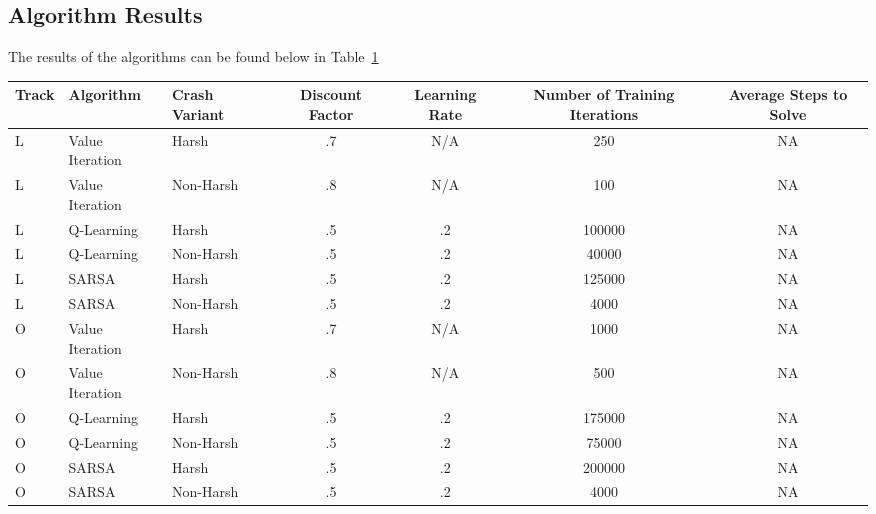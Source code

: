\documentclass{amsart}
\begin{document}
    \subsection{Algorithm Results}
    The results of the algorithms can be found below in Table~\ref{results_tab}
    \begin{table}
    \begin{adjustbox}{width=1\textwidth}
        \small
    \begin{tabular}{lllcccc}
        Track & Algorithm & Crash Variant & Discount Factor & Learning Rate & Number of Training Iterations & Average Steps to Solve \\
        \hline
        L & Value Iteration & Harsh       & .7              & N/A           & 250 & NA \\
        L & Value Iteration & Non-Harsh   & .8              & N/A           & 100 & NA \\
        L & Q-Learning      & Harsh       & .5              & .2           & 100000 & NA \\
        L & Q-Learning      & Non-Harsh   & .5              & .2           & 40000 & NA \\
        L & SARSA           & Harsh       & .5              & .2           & 125000 & NA \\
        L & SARSA           & Non-Harsh   & .5              & .2           & 4000 & NA \\
        O & Value Iteration & Harsh       & .7              & N/A           & 1000 & NA \\
        O & Value Iteration & Non-Harsh   & .8              & N/A           & 500 & NA \\
        O & Q-Learning      & Harsh       & .5              & .2           & 175000 & NA \\
        O & Q-Learning      & Non-Harsh   & .5              & .2           & 75000 & NA \\
        O & SARSA           & Harsh       & .5              & .2           & 200000 & NA \\
        O & SARSA           & Non-Harsh   & .5              & .2           & 4000 & NA \\


    \end{tabular}
    \end{adjustbox}
    \label{results_tab}
    \end{table}
\end{document}
